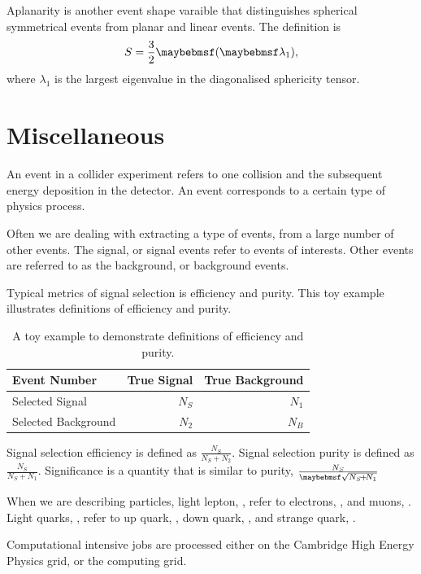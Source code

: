 Aplanarity is another event shape varaible that distinguishes spherical symmetrical events from planar and linear events. The definition is
\begin{equation}
S = \frac{3}{2}\parenths{\lambda_{1}},
\end{equation}
where $\lambda_{1}$ is the largest eigenvalue in the diagonalised sphericity tensor.

\section{Miscellaneous}

An event in a collider experiment refers to one collision and the subsequent energy deposition in the detector. An event corresponds to a certain type of physics process.

Often we are dealing with extracting a type of events, from a large number of other events. The signal, or signal events refer to events of interests. Other events are referred to as the background, or background events.

Typical metrics of signal selection is efficiency and purity. This toy example illustrates definitions of efficiency and purity.

\begin{table}[!tbp]
\begin{tabular}{lrr}
\hline
\hline
Event Number  &  True Signal & True Background  \\
\hline
Selected Signal & $N_S$ & $N_1$ \\
Selected Background & $N_2$ & $N_B$ \\
\hline
\hline

\end{tabular}
\caption[A toy example to demonstrate definitions of efficiency and purity.]%
    {A toy example to demonstrate definitions of efficiency and purity.}
\label{tab:analysisToyExample}
\end{table}
Signal selection efficiency is defined as $\frac{N_S}{N_S \! + \! N_2}$. Signal selection purity is defined as $\frac{N_S}{N_S \! + \! N_1}$.
Significance is a quantity that is similar to purity, $\frac{N_S}{\rootOf{N_S \! + \! N_1}}$

When we are describing particles, light lepton, \llight, refer to electrons, \Pem, and muons, \Pmuon. Light quarks, \qlight, refer to up quark, \Pup, down quark, \Pdown, and strange quark, \Pstrange.

Computational intensive jobs are processed either on the Cambridge High Energy Physics grid, or the \CLIC computing grid.
